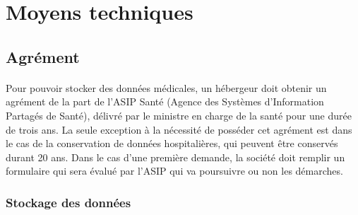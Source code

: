     \section{Moyens techniques}

        \subsection{Agrément}


\paragraph{}
Pour pouvoir stocker des données médicales, un hébergeur doit obtenir un
agrément de la part de l'ASIP Santé (Agence des Systèmes d'Information Partagés
de Santé), délivré par le ministre en charge de la santé pour une durée de
trois ans. La seule exception à la nécessité de posséder cet agrément est dans
le cas de la conservation de données hospitalières, qui peuvent être conservés
durant 20 ans. Dans le cas d'une première demande, la société doit remplir un
formulaire qui sera évalué par l'ASIP qui va poursuivre ou non les démarches.

            \subsubsection{Stockage des données}

